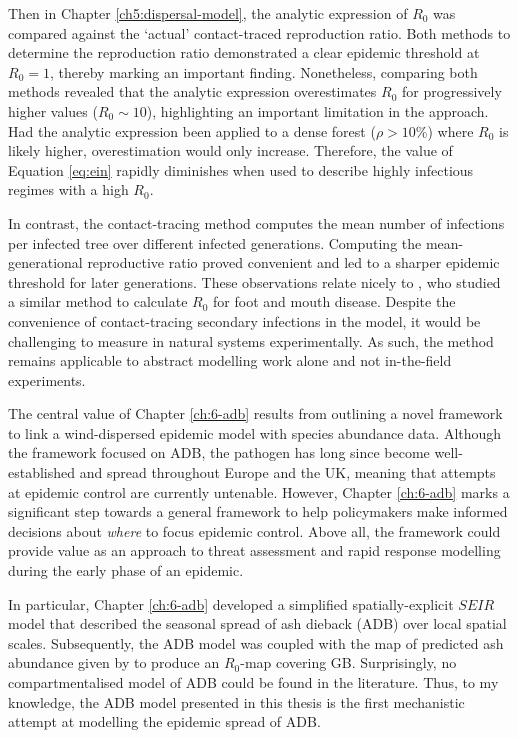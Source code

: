 Then in Chapter \ref{ch5:dispersal-model}, the analytic expression of $R_0$ was compared against the `actual' contact-traced reproduction ratio. Both methods to determine the reproduction ratio demonstrated a clear epidemic threshold at $R_0=1$, thereby marking an important finding. Nonetheless, comparing both methods revealed that the analytic expression overestimates $R_0$ for progressively higher values ($R_0 \sim 10$), highlighting an important limitation in the approach. 
Had the analytic expression been applied to a dense forest ($\rho >10\%$) where $R_0$ is likely higher, overestimation would only increase.
Therefore, the value of Equation \ref{eq:ein} rapidly diminishes when used to describe highly infectious regimes with a high $R_0$.

In contrast, the contact-tracing method computes the mean number of infections per infected tree over different infected generations.
Computing the mean-generational reproductive ratio proved convenient and led to a sharper epidemic threshold for later generations. These observations relate nicely to \cite{R0-perc-ref}, who studied a similar method to calculate $R_0$ for foot and mouth disease.
Despite the convenience of contact-tracing secondary infections in the model, it would be challenging to measure in natural systems experimentally.
As such, the method remains applicable to abstract modelling work alone and not in-the-field experiments.

The central value of Chapter \ref{ch:6-adb} results from outlining a novel framework to link a wind-dispersed epidemic model with species abundance data. Although the framework focused on ADB, the pathogen has long since become well-established and spread throughout Europe and the UK, meaning that attempts at epidemic control are currently untenable. However, Chapter \ref{ch:6-adb} marks a significant step towards a general framework to help policymakers make informed decisions about \textit{where} to focus epidemic control.
Above all, the framework could provide value as an approach to threat assessment and rapid response modelling during the early phase of an epidemic.

In particular, Chapter \ref{ch:6-adb} developed a simplified spatially-explicit $SEIR$ model that described the seasonal spread of ash dieback (ADB) over local spatial scales.
Subsequently, the ADB model was coupled with the map of predicted ash abundance given by \cite{hill.data} to produce an $R_0$-map covering GB.  
Surprisingly, no compartmentalised model of ADB could be found in the literature. Thus, to my knowledge, the ADB model presented in this thesis 
is the first mechanistic attempt at modelling the epidemic spread of ADB.

